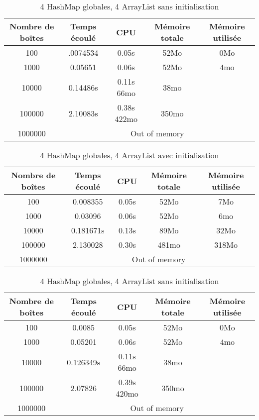 \begin{table}[h]
  \centering
\begin{tabular}{|c|c|c|c|c|}
\hline
Nombre de boîtes & Temps écoulé & CPU & Mémoire totale & Mémoire utilisée\\
\hline
100 & .0074534& 0.05s & 52Mo & 0Mo\\
\hline
1000 & 0.05651 & 0.06s & 52Mo & 4mo\\
\hline
10000 & 0.14486s & 0.11s 66mo & 38mo\\
\hline
100000 & 2.10083s & 0.38s 422mo & 350mo\\
\hline
1000000 & \multicolumn{4}{|c|}{Out of memory}\\
\hline
\end{tabular}
\caption{4 HashMap globales, 4 ArrayList sans initialisation}
\end{table}

\begin{table}[h]
  \centering
\begin{tabular}{|c|c|c|c|c|}
\hline
Nombre de boîtes & Temps écoulé & CPU & Mémoire totale & Mémoire utilisée\\
\hline
100 & 0.008355 & 0.05s & 52Mo & 7Mo\\
\hline
1000 & 0.03096 & 0.06s & 52Mo & 6mo\\
\hline
10000 & 0.181671s & 0.13s & 89Mo & 32Mo\\
\hline
100000 & 2.130028 & 0.30s & 481mo & 318Mo\\
\hline
1000000 & \multicolumn{4}{|c|}{Out of memory}\\
\hline
\end{tabular}
\caption{4 HashMap globales, 4 ArrayList avec initialisation}
\end{table}






\begin{table}[h]
  \centering
\begin{tabular}{|c|c|c|c|c|}
\hline
Nombre de boîtes & Temps écoulé & CPU & Mémoire totale & Mémoire utilisée\\
\hline
100 & 0.0085 & 0.05s & 52Mo & 0Mo\\
\hline
1000 & 0.05201 & 0.06s & 52Mo & 4mo\\
\hline
10000 & 0.126349s & 0.11s 66mo & 38mo\\
\hline
100000 & 2.07826 & 0.39s 420mo & 350mo\\
\hline
1000000 & \multicolumn{4}{|c|}{Out of memory}\\
\hline
\end{tabular}
\caption{4 HashMap globales, 4 ArrayList sans initialisation}
\end{table}

